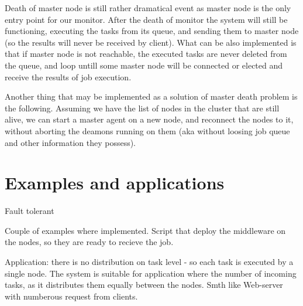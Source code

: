 \documentclass[12pt]{article}
\begin{document}
Death of master node is still rather dramatical event as master node is the only entry point for our monitor. After the death of monitor the system will still be functioning, executing the tasks from its queue, and sending them to master node (so the results will never be received by client). What can be also implemented is that if master node is not reachable, the executed tasks are never deleted from the queue, and loop untill some master node will be connected or elected and receive the results of job execution.

Another thing that may be implemented as a solution of master death problem is the following. Assuming we have the list of nodes in the cluster that are still alive, we can start a master agent on a new node, and reconnect the nodes to it, without aborting the deamons running on them (aka without loosing job queue and other information they possess).

\section{Examples and applications}


Fault tolerant

Couple of examples where implemented. Script that deploy the middleware on the nodes, so they are ready to recieve the job.

Application: there is no distribution on task level - so each task is executed by a single node. The system is suitable for application where the number of incoming tasks, as it distributes them equally between the nodes. Smth like Web-server with numberous request from clients.
\end{document}
